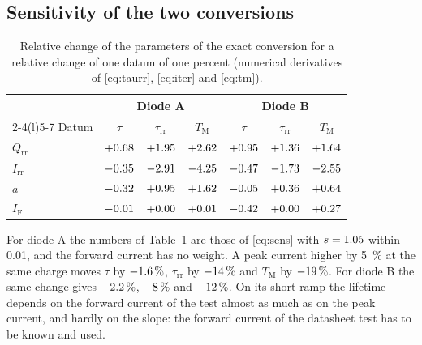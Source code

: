 \documentclass[10pt,a4paper]{scrartcl}
\newcommand{\IF}{I_\mathrm{F}}
\newcommand{\Irr}{I_\mathrm{rr}}
\newcommand{\Qrr}{Q_\mathrm{rr}}
\newcommand{\taurr}{\tau_\mathrm{rr}}
\newcommand{\TM}{T_\mathrm{M}}
\begin{document}
\subsection{Sensitivity of the two conversions}
\begin{table}[htb]
\centering\small
\caption{Relative change of the parameters of the exact conversion for a relative change of one datum of one percent (numerical derivatives of \eqref{eq:taurr}, \eqref{eq:iter} and \eqref{eq:tm}).}
\label{tab:sensex}
\begin{tabular}{@{}lcccccc@{}}
\toprule
 & \multicolumn{3}{c}{Diode A} & \multicolumn{3}{c}{Diode B} \\
\cmidrule(lr){2-4}\cmidrule(l){5-7}
Datum & $\tau$ & $\taurr$ & $\TM$ & $\tau$ & $\taurr$ & $\TM$ \\
\midrule
$\Qrr$ & $+0.68$ & $+1.95$ & $+2.62$ & $+0.95$ & $+1.36$ & $+1.64$ \\
$\Irr$ & $-0.35$ & $-2.91$ & $-4.25$ & $-0.47$ & $-1.73$ & $-2.55$ \\
$a$ & $-0.32$ & $+0.95$ & $+1.62$ & $-0.05$ & $+0.36$ & $+0.64$ \\
$\IF$ & $-0.01$ & $+0.00$ & $+0.01$ & $-0.42$ & $+0.00$ & $+0.27$ \\
\bottomrule
\end{tabular}
\end{table}
For diode A the numbers of Table~\ref{tab:sensex} are those of \eqref{eq:sens} with $s = 1.05$ within \num{0.01}, and the forward current has no weight. A peak current higher by \SI{5}{\percent} at the same charge moves $\tau$ by $-1.6\,\%$, $\taurr$ by $-14\,\%$ and $\TM$ by $-19\,\%$. For diode B the same change gives $-2.2\,\%$, $-8\,\%$ and $-12\,\%$. On its short ramp the lifetime depends on the forward current of the test almost as much as on the peak current, and hardly on the slope: the forward current of the datasheet test has to be known and used.

\end{document}
